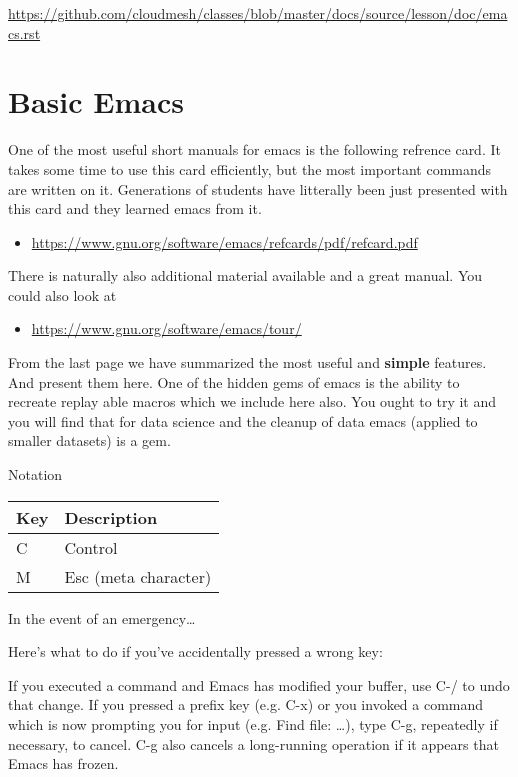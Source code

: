 \begin{fileremark}\url{https://github.com/cloudmesh/classes/blob/master/docs/source/lesson/doc/emacs.rst}\end{fileremark}
\section{Basic Emacs}\label{basic-emacs}

One of the most useful short manuals for emacs is the following refrence
card. It takes some time to use this card efficiently, but the most
important commands are written on it. Generations of students have
litterally been just presented with this card and they learned emacs
from it.

\begin{itemize}
\tightlist
\item
  \url{https://www.gnu.org/software/emacs/refcards/pdf/refcard.pdf}
\end{itemize}

There is naturally also additional material available and a great
manual. You could also look at

\begin{itemize}
\tightlist
\item
  \url{https://www.gnu.org/software/emacs/tour/}
\end{itemize}

From the last page we have summarized the most useful and
\textbf{simple} features. And present them here. One of the hidden gems
of emacs is the ability to recreate replay able macros which we include
here also. You ought to try it and you will find that for data science
and the cleanup of data emacs (applied to smaller datasets) is a gem.

Notation

\begin{longtable}[]{@{}ll@{}}
\toprule
Key & Description\tabularnewline
\midrule
\endhead
C & Control\tabularnewline
M & Esc (meta character)\tabularnewline
\bottomrule
\end{longtable}

In the event of an emergency\ldots{}

Here's what to do if you've accidentally pressed a wrong key:

If you executed a command and Emacs has modified your buffer, use C-/ to
undo that change. If you pressed a prefix key (e.g. C-x) or you invoked
a command which is now prompting you for input (e.g. Find file:
\ldots{}), type C-g, repeatedly if necessary, to cancel. C-g also
cancels a long-running operation if it appears that Emacs has frozen.

